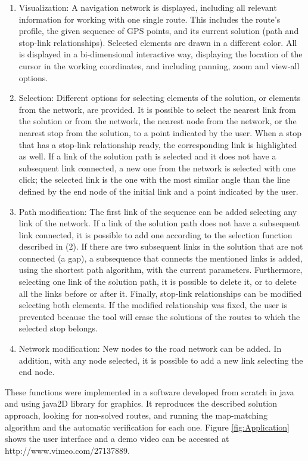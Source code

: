 \begin{enumerate}
\item Visualization: A navigation network is displayed, including all relevant information for working with one single route. This includes the route’s profile, the given sequence of GPS points, and its current solution (path and stop-link relationships). Selected elements are drawn in a different color. All is displayed in a bi-dimensional interactive way, displaying the location of the cursor in the working coordinates, and including panning, zoom and view-all options.
\item Selection: Different options for selecting elements of the solution, or elements from the network, are provided. It is possible to select the nearest link from the solution or from the network, the nearest node from the network, or the nearest stop from the solution, to a point indicated by the user. When a stop that has a stop-link relationship ready, the corresponding link is highlighted as well. If a link of the solution path is selected and it does not have a subsequent link connected, a new one from the network is selected with one click; the selected link is the one with the most similar angle than the line defined by the end node of the initial link and a point indicated by the user.
\item Path modification: The first link of the sequence can be added selecting any link of the network. If a link of the solution path does not have a subsequent link connected, it is possible to add one according to the selection function described in (2). If there are two subsequent links in the solution that are not connected (a gap), a subsequence that connects the mentioned links is added, using the shortest path algorithm, with the current parameters. Furthermore, selecting one link of the solution path, it is possible to delete it, or to delete all the links before or after it. Finally, stop-link relationships can be modified selecting both elements. If the modified relationship was fixed, the user  is prevented because the tool will erase the solutions of the routes to which the selected stop belongs.
\item Network modification: New nodes to the road network can be added. In addition, with any node selected, it is possible to add a new link selecting the end node.
\end{enumerate}

These functions were implemented in a software developed from scratch in java and using java2D library for graphics. It reproduces the described solution approach, looking for non-solved routes, and running the map-matching algorithm and the automatic verification for each one. Figure \ref{fig:Application} shows the user interface and a demo video can be accessed at http://www.vimeo.com/27137889.

